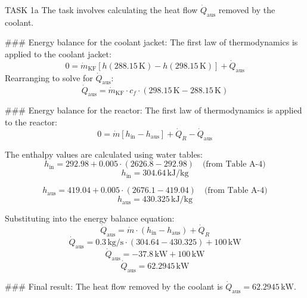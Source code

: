 TASK 1a  
The task involves calculating the heat flow \( \dot{Q}_{\text{aus}} \) removed by the coolant.  

### Energy balance for the coolant jacket:
The first law of thermodynamics is applied to the coolant jacket:  
\[
0 = \dot{m}_{\text{KF}} \left[ h(288.15 \, \text{K}) - h(298.15 \, \text{K}) \right] + \dot{Q}_{\text{aus}}
\]  
Rearranging to solve for \( \dot{Q}_{\text{aus}} \):  
\[
\dot{Q}_{\text{aus}} = \dot{m}_{\text{KF}} \cdot c_f \cdot \left( 298.15 \, \text{K} - 288.15 \, \text{K} \right)
\]  

### Energy balance for the reactor:
The first law of thermodynamics is applied to the reactor:  
\[
0 = \dot{m} \left[ h_{\text{in}} - h_{\text{aus}} \right] + \dot{Q}_R - \dot{Q}_{\text{aus}}
\]  

The enthalpy values are calculated using water tables:  
\[
h_{\text{in}} = 292.98 + 0.005 \cdot (2626.8 - 292.98) \quad \text{(from Table A-4)}
\]  
\[
h_{\text{in}} = 304.64 \, \text{kJ/kg}
\]  

\[
h_{\text{aus}} = 419.04 + 0.005 \cdot (2676.1 - 419.04) \quad \text{(from Table A-4)}
\]  
\[
h_{\text{aus}} = 430.325 \, \text{kJ/kg}
\]  

Substituting into the energy balance equation:  
\[
\dot{Q}_{\text{aus}} = \dot{m} \cdot \left( h_{\text{in}} - h_{\text{aus}} \right) + \dot{Q}_R
\]  
\[
\dot{Q}_{\text{aus}} = 0.3 \, \text{kg/s} \cdot \left( 304.64 - 430.325 \right) + 100 \, \text{kW}
\]  
\[
\dot{Q}_{\text{aus}} = -37.8 \, \text{kW} + 100 \, \text{kW}
\]  
\[
\dot{Q}_{\text{aus}} = 62.2945 \, \text{kW}
\]  

### Final result:
The heat flow removed by the coolant is \( \dot{Q}_{\text{aus}} = 62.2945 \, \text{kW} \).